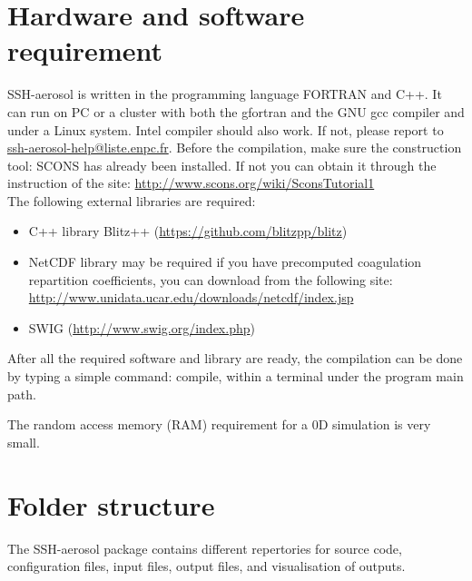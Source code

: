 \documentclass[a4paper,11pt]{article}
\begin{document}
\section*{Hardware and software requirement}
SSH-aerosol is written in the programming language FORTRAN and C++. It can run on PC or a cluster with both the gfortran and the GNU gcc compiler and under a Linux system. Intel compiler should also work. If not, please report to  \url{ssh-aerosol-help@liste.enpc.fr}.
Before the compilation, make sure the construction tool: SCONS has already been installed. 
If not you can obtain it through the instruction of the site: \url{http://www.scons.org/wiki/SconsTutorial1}\\

The following external libraries are required:
\begin{itemize}
\item C++ library Blitz++ (\url{https://github.com/blitzpp/blitz})
\item NetCDF library may be required if you have precomputed coagulation repartition coefficients, you can download from the following site:
\url{http://www.unidata.ucar.edu/downloads/netcdf/index.jsp}
\item SWIG (\url{http://www.swig.org/index.php})
\end{itemize}
After all the required software and library are ready, the compilation can be done by typing a simple command: compile, within a terminal under the program main path.

The random access memory (RAM) requirement for a 0D simulation is very small. 


\section{Folder structure}

The SSH-aerosol package contains different repertories for source code,  configuration files, input files, output files, and visualisation of outputs.
\end{document}
